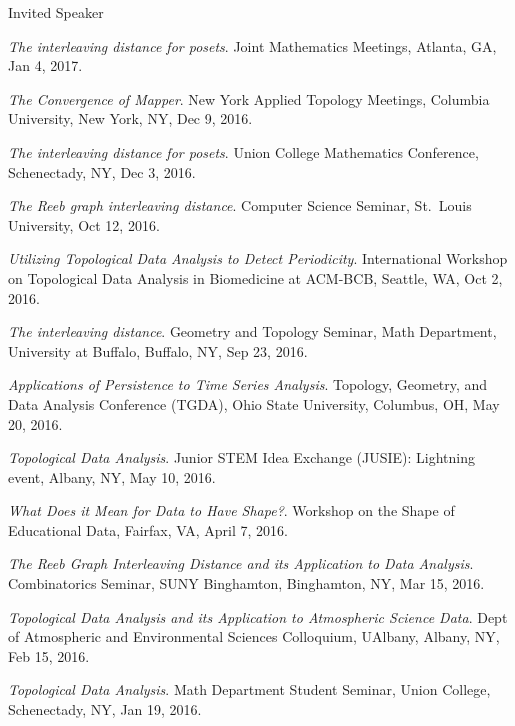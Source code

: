 \documentclass{resume} %
\begin{document}
\begin{rSection}{Invited Speaker}
\begin{etaremune}
\item\emph{The interleaving distance for posets}. Joint Mathematics Meetings, Atlanta, GA, Jan 4, 2017. 

\item\emph{The Convergence of Mapper}. New York Applied Topology Meetings, Columbia University, New York, NY, Dec 9, 2016. 

\item\emph{The interleaving distance for posets}. Union College Mathematics Conference, Schenectady, NY, Dec 3, 2016. 

\item\emph{The Reeb graph interleaving distance}. Computer Science Seminar, St.~Louis University, Oct 12, 2016. 

\item\emph{Utilizing Topological Data Analysis to Detect Periodicity}. International Workshop on Topological Data Analysis in Biomedicine at ACM-BCB, Seattle, WA, Oct 2, 2016. 

\item\emph{The interleaving distance}. Geometry and Topology Seminar, Math Department, University at Buffalo, Buffalo, NY, Sep 23, 2016. 

\item\emph{Applications of Persistence to Time Series Analysis}. Topology, Geometry, and Data Analysis Conference (TGDA), Ohio State University, Columbus, OH, May 20, 2016. 

\item\emph{Topological Data Analysis}. Junior STEM Idea Exchange (JUSIE): Lightning event, Albany, NY, May 10, 2016. 

\item\emph{What Does it Mean for Data to Have Shape?}. Workshop on the Shape of Educational Data, Fairfax, VA, April 7, 2016. 

\item\emph{The Reeb Graph Interleaving Distance and its Application to Data Analysis}. Combinatorics Seminar, SUNY Binghamton, Binghamton, NY, Mar 15, 2016. 

\item\emph{Topological Data Analysis and its Application to Atmospheric Science Data}. Dept of Atmospheric and Environmental Sciences Colloquium, UAlbany, Albany, NY, Feb 15, 2016. 

\item\emph{Topological Data Analysis}. Math Department Student Seminar, Union College, Schenectady, NY, Jan 19, 2016. 


\end{etaremune}
\end{rSection}
\end{document}
